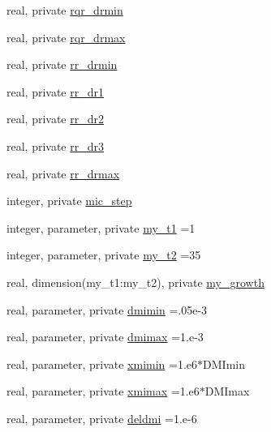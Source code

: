 \begin{DoxyCompactItemize}
\item 
real, private \hyperlink{namespacemodule__microphysics_af455571cfd5c41222b9cf86fd014a30f}{rqr\+\_\+drmin}
\item 
real, private \hyperlink{namespacemodule__microphysics_ae58b71fa9e96b0836c12a143455ca83b}{rqr\+\_\+drmax}
\item 
real, private \hyperlink{namespacemodule__microphysics_a6f0adb81dca26899ff77f0a454206559}{rr\+\_\+drmin}
\item 
real, private \hyperlink{namespacemodule__microphysics_a31a6bca21f180e2715bbefa18ef32b08}{rr\+\_\+dr1}
\item 
real, private \hyperlink{namespacemodule__microphysics_a47ffe9826a0f85b6bf41c1cf06cf148f}{rr\+\_\+dr2}
\item 
real, private \hyperlink{namespacemodule__microphysics_afbed7ecd787abc8db3c7ff6160412fa1}{rr\+\_\+dr3}
\item 
real, private \hyperlink{namespacemodule__microphysics_af631f5533a9284cf93087bb35396a9de}{rr\+\_\+drmax}
\item 
integer, private \hyperlink{namespacemodule__microphysics_acb3899d31d6f2079a2d41c3e551e3443}{mic\+\_\+step}
\item 
integer, parameter, private \hyperlink{namespacemodule__microphysics_aae73524f22f4bc2373aaa5d8a6f7e7d6}{my\+\_\+t1} =1
\item 
integer, parameter, private \hyperlink{namespacemodule__microphysics_a01af6bac32c88fd12ba020f66ad0ae80}{my\+\_\+t2} =35
\item 
real, dimension(my\+\_\+t1\+:my\+\_\+t2), private \hyperlink{namespacemodule__microphysics_a05041f6bd94be58f8b3bddac6b374b41}{my\+\_\+growth}
\item 
real, parameter, private \hyperlink{namespacemodule__microphysics_a10a6db795f339c47c5afd6916d0c196b}{dmimin} =.\+05e-\/3
\item 
real, parameter, private \hyperlink{namespacemodule__microphysics_ab71ad8ff5f6f170585e96194373be5cc}{dmimax} =1.e-\/3
\item 
real, parameter, private \hyperlink{namespacemodule__microphysics_ac355dc0d92140f99522cb35dc025e9b3}{xmimin} =1.e6$\ast$D\+M\+Imin
\item 
real, parameter, private \hyperlink{namespacemodule__microphysics_ae678585401e3fd39ce21f225ae430677}{xmimax} =1.e6$\ast$D\+M\+Imax
\item 
real, parameter, private \hyperlink{namespacemodule__microphysics_a50ee0e811da6e52c191f977407e9e47d}{deldmi} =1.e-\/6
\item 

\end{DoxyCompactItemize}
